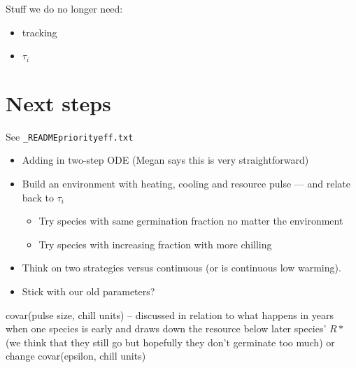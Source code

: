 \documentclass[11pt,letter]{article}
\begin{document}
Stuff we do no longer need:
\begin{itemize}
\item tracking
\item $\tau_i$
\end{itemize}

\section{Next steps}

See \verb|_READMEpriorityeff.txt|

\begin{itemize}
\item Adding in two-step ODE (Megan says this is very straightforward)
\item  Build an environment with heating, cooling and resource pulse — and relate back to $\tau_i$
\begin{itemize}
\item Try species with same germination fraction no matter the environment
\item Try species with increasing fraction with more chilling 
\end{itemize}
\item Think on two strategies versus continuous (or is continuous low warming).
\item Stick with our old parameters? 
\end{itemize}

covar(pulse size, chill units) -- discussed in relation to what happens in years when one species is early and draws down the resource below later species' $R*$ (we think that they still go but hopefully they don't germinate too much) or change covar(epsilon, chill units)\\
\end{document}
